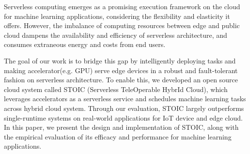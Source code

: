 Serverless computing emerges as a promising execution framework on the cloud for machine learning applications, considering the flexibility and elasticity it offers. However, the imbalance of computing resources between edge and public cloud dampens the availability and efficiency of serverless architecture, and consumes extraneous energy and costs from end users. 

The goal of our work is to bridge this gap by intelligently deploying tasks and making accelerator(e.g. GPU) serve edge devices in a robust and fault-tolerant fashion on serverless architecture. To enable this, we developed an open source cloud system called STOIC (Serverless TeleOperable HybrId Cloud), which leverages accelerators as a serverless service and schedules machine learning tasks across hybrid cloud system. Through our evaluation, STOIC largely outperforms single-runtime systems on real-world applications for IoT device and edge cloud. In this paper, we present the design and implementation of STOIC, along with the empirical evaluation of its efficacy and performance for machine learning applications.